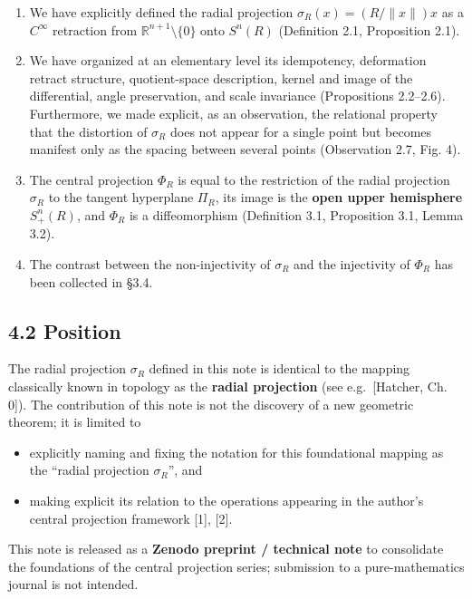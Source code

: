 \documentclass[
]{ltjsarticle}
\providecommand{\tightlist}{%
  \setlength{\itemsep}{0pt}\setlength{\parskip}{0pt}}
\begin{document}
\begin{enumerate}
\def\labelenumi{\arabic{enumi}.}
\tightlist
\item
  We have explicitly defined the radial projection
  \(\sigma_R(x) = (R/\|x\|) x\) as a \(C^\infty\) retraction from
  \(\mathbb{R}^{n+1} \setminus \{0\}\) onto \(S^n(R)\) (Definition 2.1,
  Proposition 2.1).
\item
  We have organized at an elementary level its idempotency, deformation
  retract structure, quotient-space description, kernel and image of the
  differential, angle preservation, and scale invariance (Propositions
  2.2--2.6). Furthermore, we made explicit, as an observation, the
  relational property that the distortion of \(\sigma_R\) does not
  appear for a single point but becomes manifest only as the spacing
  between several points (Observation 2.7, Fig. 4).
\item
  The central projection \(\Phi_R\) is equal to the restriction of the
  radial projection \(\sigma_R\) to the tangent hyperplane \(\Pi_R\),
  its image is the \textbf{open upper hemisphere \(S^n_+(R)\)}, and
  \(\Phi_R\) is a diffeomorphism (Definition 3.1, Proposition 3.1, Lemma
  3.2).
\item
  The contrast between the non-injectivity of \(\sigma_R\) and the
  injectivity of \(\Phi_R\) has been collected in §3.4.
\end{enumerate}

\subsection{4.2 Position}\label{position}

The radial projection \(\sigma_R\) defined in this note is identical to
the mapping classically known in topology as the \textbf{radial
projection} (see e.g.~{[}Hatcher, Ch. 0{]}). The contribution of this
note is not the discovery of a new geometric theorem; it is limited to

\begin{itemize}
\tightlist
\item
  explicitly naming and fixing the notation for this foundational
  mapping as the ``radial projection \(\sigma_R\)'', and
\item
  making explicit its relation to the operations appearing in the
  author's central projection framework {[}1{]}, {[}2{]}.
\end{itemize}

This note is released as a \textbf{Zenodo preprint / technical note} to
consolidate the foundations of the central projection series; submission
to a pure-mathematics journal is not intended.
\end{document}
